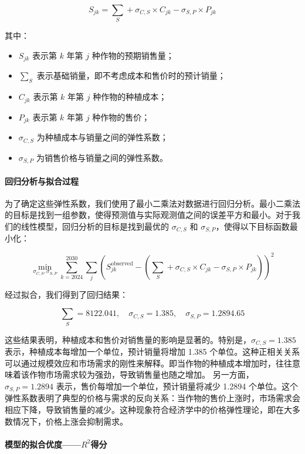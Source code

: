 \documentclass[12pt,a4paper]{nmmcm}
\begin{document}
\[
  S_{jk} = \sum_S + \sigma_{C,S} \times C_{jk} - \sigma_{S,P} \times P_{jk}
\]

其中：
\begin{itemize}
  \item $S_{jk}$ 表示第 $k$ 年第 $j$ 种作物的预期销售量；
  \item $\sum_S$ 表示基础销量，即不考虑成本和售价时的预计销量；
  \item $C_{jk}$ 表示第 $k$ 年第 $j$ 种作物的种植成本；
  \item $P_{jk}$ 表示第 $k$ 年第 $j$ 种作物的售价；
  \item $\sigma_{C,S}$ 为种植成本与销量之间的弹性系数；
  \item $\sigma_{S,P}$ 为销售价格与销量之间的弹性系数。
\end{itemize}

\paragraph{回归分析与拟合过程}

为了确定这些弹性系数，我们使用了最小二乘法对数据进行回归分析。最小二乘法的目标是找到一组参数，使得预测值与实际观测值之间的误差平方和最小。对于我们的线性模型，回归分析的目标是找到最优的 $\sigma_{C,S}$ 和 $\sigma_{S,P}$，使得以下目标函数最小化：

\[
  \min_{\sigma_{C,S}, \sigma_{S,P}} \sum_{k=2024}^{2030} \sum_{j} \left( S_{jk}^{\text{observed}} - \left( \sum_S + \sigma_{C,S} \times C_{jk} - \sigma_{S,P} \times P_{jk} \right) \right)^2
\]

经过拟合，我们得到了回归结果：

\[
  \sum_S = 8122.041, \quad \sigma_{C,S} = 1.385, \quad \sigma_{S,P} = 1.2894.65
\]


这些结果表明，种植成本和售价对销售量的影响是显著的。特别是，$\sigma_{C,S} = 1.385$ 表示，种植成本每增加一个单位，预计销量将增加 1.385 个单位。这种正相关关系可以通过规模效应和市场需求的刚性来解释。即当作物的种植成本增加时，往往意味着该作物市场需求较为强劲，导致销售量也随之增加。
另一方面，$\sigma_{S,P} = 1.2894$ 表示，售价每增加一个单位，预计销量将减少 1.2894 个单位。这个弹性系数表明了典型的价格与需求的反向关系：当作物的售价上涨时，市场需求会相应下降，导致销售量的减少。这种现象符合经济学中的价格弹性理论，即在大多数情况下，价格上涨会抑制需求。

\paragraph{模型的拟合优度——$R^2$得分}
\end{document}
